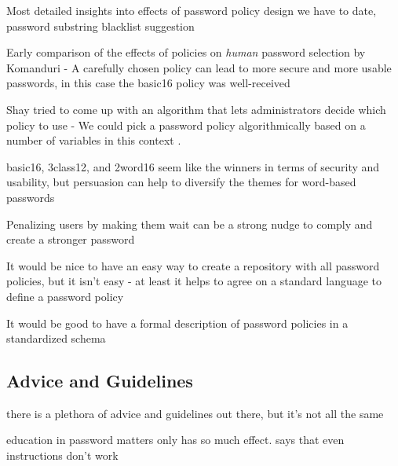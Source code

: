 	Most detailed insights into effects of password policy design we have to date, password substring blacklist suggestion \cite{Shay2016DesigningPasswordPolicies}
	
	\cite{Weir2010MetricsPolicies}
	
	\cite{Wang2015EmperorsPolicies}
	
	
	\cite{Florencio2010WhereDoPoliciesComeFrom}
	
	\cite{Horsch2016PasswordPolicyMarkup}
	
	\cite{Chiasson2015QuantifyingExpiration}
	\cite{Blocki2013OptimizingPasswordPolicies}
	
	Early comparison of the effects of policies on \textit{human} password selection by Komanduri \etal - A carefully chosen policy can lead to more secure and more usable passwords, in this case the basic16 policy was well-received \cite{Komanduri2011OfPasswordsAndPeople}
	
	
	Shay tried to come up with an algorithm that lets administrators decide which policy to use - We could pick a password policy algorithmically based on a number of variables in this context \cite{Shay2009PolicySimulation}.
	
	basic16, 3class12, and 2word16 seem like the winners in terms of security and usability, but persuasion can help to diversify the themes for word-based passwords \cite{Shay2014CanLongPasswordsBeSecureAndUsable}
	
	
	Penalizing users by making them wait can be a strong nudge to comply and create a stronger password \cite{Malkin2013Waiting}
	
	It would be nice to have an easy way to create a repository with all password policies, but it isn't easy - at least it helps to agree on a standard language to define a password policy \cite{Steves2015PasswordPolicyLanguage}
	
	It would be good to have a formal description of password policies in a standardized schema \cite{Horsch2016PasswordPolicyMarkup}

	\subsection{Advice and Guidelines}\label{sec:rw:advice_guidance}
	
	there is a plethora of advice and guidelines out there, but it's not all the same 
	
	education in password matters only has so much effect. 
	\cite{Forget2007HelpingUsers} says that even instructions don't work
	
